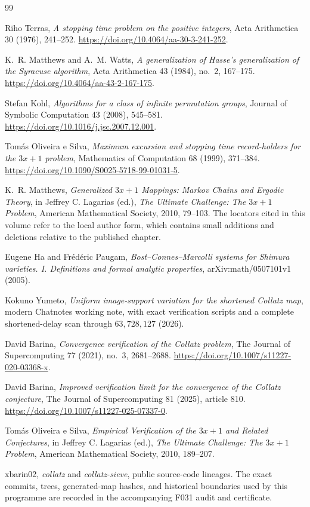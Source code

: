 \begin{thebibliography}{99}

Riho Terras,
\emph{A stopping time problem on the positive integers},
Acta Arithmetica 30 (1976), 241--252.
\url{https://doi.org/10.4064/aa-30-3-241-252}.

K.~R. Matthews and A.~M. Watts,
\emph{A generalization of Hasse's generalization of the Syracuse algorithm},
Acta Arithmetica 43 (1984), no.~2, 167--175.
\url{https://doi.org/10.4064/aa-43-2-167-175}.

Stefan Kohl,
\emph{Algorithms for a class of infinite permutation groups},
Journal of Symbolic Computation 43 (2008), 545--581.
\url{https://doi.org/10.1016/j.jsc.2007.12.001}.

Tom\'as Oliveira e Silva,
\emph{Maximum excursion and stopping time record-holders for the $3x+1$
problem},
Mathematics of Computation 68 (1999), 371--384.
\url{https://doi.org/10.1090/S0025-5718-99-01031-5}.

K.~R. Matthews,
\emph{Generalized $3x+1$ Mappings: Markov Chains and Ergodic Theory},
in Jeffrey C. Lagarias (ed.),
\emph{The Ultimate Challenge: The $3x+1$ Problem},
American Mathematical Society, 2010, 79--103.
The locators cited in this volume refer to the local author form, which
contains small additions and deletions relative to the published chapter.

Eugene Ha and Fr\'ed\'eric Paugam,
\emph{Bost--Connes--Marcolli systems for Shimura varieties. I. Definitions
and formal analytic properties},
arXiv:math/0507101v1 (2005).

Kokuno Yumeto,
\emph{Uniform image-support variation for the shortened Collatz map},
modern Chatnotes working note, with exact verification scripts and a complete
shortened-delay scan through $63{,}728{,}127$ (2026).

David Barina,
\emph{Convergence verification of the Collatz problem},
The Journal of Supercomputing 77 (2021), no.~3, 2681--2688.
\url{https://doi.org/10.1007/s11227-020-03368-x}.

David Barina,
\emph{Improved verification limit for the convergence of the Collatz
conjecture},
The Journal of Supercomputing 81 (2025), article 810.
\url{https://doi.org/10.1007/s11227-025-07337-0}.

Tom\'as Oliveira e Silva,
\emph{Empirical Verification of the $3x+1$ and Related Conjectures},
in Jeffrey C. Lagarias (ed.),
\emph{The Ultimate Challenge: The $3x+1$ Problem},
American Mathematical Society, 2010, 189--207.

xbarin02,
\emph{collatz} and \emph{collatz-sieve}, public source-code lineages.
The exact commits, trees, generated-map hashes, and historical boundaries used
by this programme are recorded in the accompanying F031 audit and certificate.

\end{thebibliography}
